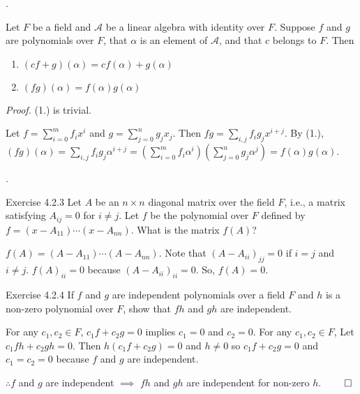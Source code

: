\documentclass[8pt]{beamer}
\newcommand{\mc}[1]{\mathcal{#1}}
\newcommand{\ti}[1]{\textit{#1}}
\begin{document}
\begin{frame}{.}
    \begin{theorem}
        Let $F$ be a field and $\mc{A}$ be a linear algebra with identity over $F$.
        Suppose $f$ and $g$ are polynomials over $F$, that $\alpha$ is an element of $\mc{A}$, and that $c$ belongs to $F$.
        Then
        \begin{enumerate}
            \item $(cf+g) (\alpha) = cf(\alpha) + g(\alpha)$
            \item $(fg)(\alpha) = f(\alpha)g(\alpha)$
        \end{enumerate}
    \end{theorem}
    \ti{Proof.}
    (1.) is trivial.

    Let $f = \sum_{i=0}^m f_i x^i$  and $g = \sum_{j=0}^n g_j x_j$.
    Then $fg = \sum_{i,j} f_i g_j x^{i+j}$.
    By (1.), $(fg)(\alpha) = \sum_{i,j} f_i g_j \alpha^{i+j} = (\sum_{i=0}^m f_i \alpha^i)(\sum_{j=0}^n g_j \alpha^j) = f(\alpha) g(\alpha)$.
\end{frame}

\begin{frame}{.}

    \begin{block}{Exercise 4.2.3}
        Let $A$ be an $n \times n$ diagonal matrix over the field $F$, i.e., a matrix satisfying $A_{ij} =0$ for $i \neq j$.
        Let $f$ be the polynomial over $F$ defined by $f = (x- A_{11})\cdots (x-A_{nn})$.
        What is the matrix $f(A)$?
    \end{block}
    $f(A) = (A- A_{11}) \cdots (A - A_{nn})$.
    Note that $(A-A_{ii})_{jj} = 0$ if $i = j$ and $i \neq j$.
    $f(A)_{ii} = 0$ because $(A - A_{ii})_{ii} = 0$.
    So, $f(A) = 0$.
    
    \begin{block}{Exercise 4.2.4}
        If $f$ and $g$ are independent polynomials over a field $F$ and $h$ is a non-zero polynomial over $F$, show that $fh$ and $gh$ are independent.
    \end{block}
    For any $c_1, c_2 \in F$, $c_1 f + c_2 g = 0$ implies $c_1 = 0$ and $c_2 = 0$.
    For any $c_1, c_2 \in F$, Let $c_1 fh + c_2 gh = 0$.
    Then $h(c_1f + c_2g) = 0$ and $h \neq 0$ so $c_1 f + c_2 g = 0$ and $c_1 = c_2 =0$ because $f$ and $g$ are independent.

    $\therefore  f$ and $g$ are independent $\implies$ $fh$ and $gh$ are independent for non-zero $h$.
    $\qed$
\end{frame}
\end{document}
